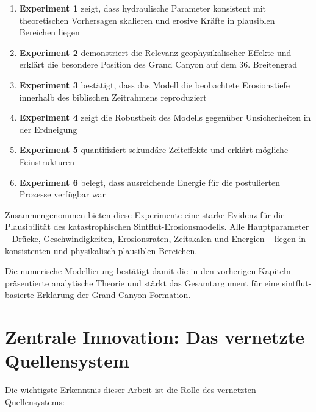 ﻿\documentclass[12pt,a4paper]{report}
\begin{document}
\begin{enumerate}
	\item \textbf{Experiment 1} zeigt, dass hydraulische Parameter konsistent mit theoretischen Vorhersagen skalieren und erosive Kräfte in plausiblen Bereichen liegen
	
	\item \textbf{Experiment 2} demonstriert die Relevanz geophysikalischer Effekte und erklärt die besondere Position des Grand Canyon auf dem 36. Breitengrad
	
	\item \textbf{Experiment 3} bestätigt, dass das Modell die beobachtete Erosionstiefe innerhalb des biblischen Zeitrahmens reproduziert
	
	\item \textbf{Experiment 4} zeigt die Robustheit des Modells gegenüber Unsicherheiten in der Erdneigung
	
	\item \textbf{Experiment 5} quantifiziert sekundäre Zeiteffekte und erklärt mögliche Feinstrukturen
	
	\item \textbf{Experiment 6} belegt, dass ausreichende Energie für die postulierten Prozesse verfügbar war
\end{enumerate}

Zusammengenommen bieten diese Experimente eine starke Evidenz für die Plausibilität des katastrophischen Sintflut-Erosionsmodells. Alle Hauptparameter -- Drücke, Geschwindigkeiten, Erosionsraten, Zeitskalen und Energien -- liegen in konsistenten und physikalisch plausiblen Bereichen.

Die numerische Modellierung bestätigt damit die in den vorherigen Kapiteln präsentier\-te analytische Theorie und stärkt das Gesamtargument für eine sintflut-basierte Erklärung der Grand Canyon Formation.

\section{Zentrale Innovation: Das vernetzte Quellensystem}

Die wichtigste Erkenntnis dieser Arbeit ist die Rolle des vernetzten Quellensystems:

\begin{center}
\end{center}
\end{document}
